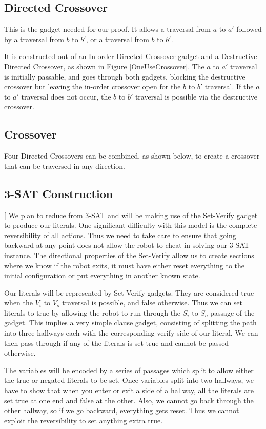 \documentclass[11pt]{article}
\makeatletter
\gdef\xxx{\@ifnextchar[\xxx@lab\xxx@nolab}
\makeatother
\begin{document}
\subsection{Directed Crossover}
This is the gadget needed for our proof. It allows a traversal from $a$ to $a'$ followed by a traversal from $b$ to $b'$, or a traversal from $b$ to $b'$.

It is constructed out of an In-order Directed Crossover gadget and a Destructive Directed Crossover, as shown in Figure \ref{OneUseCrossover}. The $a$ to $a'$ traversal is initially passable, and goes through both gadgets,
blocking the destructive crossover but leaving the in-order crossover open for the $b$ to $b'$ traversal. If the $a$ to $a'$ traversal does not occur, the $b$ to $b'$ traversal is possible via the destructive crossover.

\subsection{Crossover}
Four Directed Crossovers can be combined, as shown below, to create a crossover that can be traversed in any direction.

\subsection{3-SAT Construction}
\xxx{add variable and clause gadget diagrams}
We plan to reduce from 3-SAT and will be making use of the Set-Verify gadget to produce our literals. One significant difficulty with this model is the complete reversibility of all actions. Thus we need to take care to ensure that going backward at any point does not allow the robot to cheat in solving our 3-SAT instance. The directional properties of the Set-Verify allow us to create sections where we know if the robot exits, it must have either reset everything to the initial configuration or put everything in another known state.

Our literals will be represented by Set-Verify gadgets. They are considered true when the $V_i$ to $V_o$ traversal is possible, and false otherwise. Thus we can set literals to true by allowing the robot to run through the $S_i$ to $S_o$ passage of the gadget. This implies a very simple clause gadget, consisting of splitting the path into three hallways each with the corresponding verify side of our literal. We can then pass through if any of the literals is set true and cannot be passed otherwise.

The variables will be encoded by a series of passages which split to allow either the true or negated literals to be set. Once variables split into two hallways, we have to show that when you enter or exit a side of a hallway, all the literals are set true at one end and false at the other. Also, we cannot go back through the other hallway, so if we go backward, everything gets reset. Thus we cannot exploit the reversibility to set anything extra true.
\end{document}
